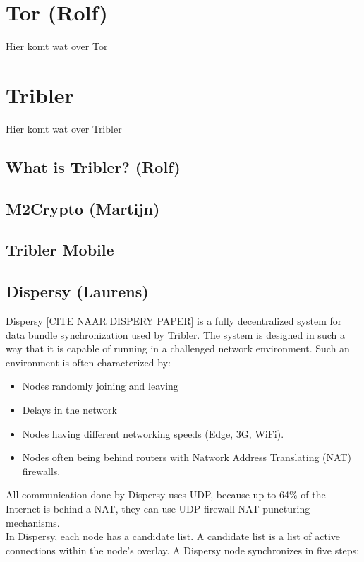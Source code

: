 \documentclass[11pt]{article}
\begin{document}
\section{Tor (Rolf)}
Hier komt wat over Tor

\section{Tribler}
Hier komt wat over Tribler

\subsection{What is Tribler? (Rolf)}

\subsection{M2Crypto (Martijn)}

\subsection{Tribler Mobile}

\subsection{Dispersy (Laurens)}
Dispersy [CITE NAAR DISPERY PAPER] is a fully decentralized system for data bundle synchronization used by Tribler. The system is designed in such a way that it is capable of running in a challenged network environment. Such an environment is often characterized by:
\begin{itemize}
\item Nodes randomly joining and leaving
\item Delays in the network
\item Nodes having different networking speeds (Edge, 3G, WiFi).
\item Nodes often being behind routers with Natwork Address Translating (NAT) firewalls.
\end{itemize}

All communication done by Dispersy uses UDP, because up to 64\% of the Internet is behind a NAT, they can use UDP firewall-NAT puncturing mechanisms.\\

In Dispersy, each node has a candidate list. A candidate list is a list of active connections within the node's overlay. A Dispersy node synchronizes in five steps:
\end{document}
